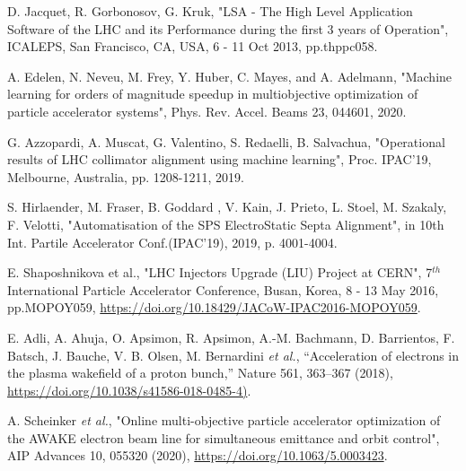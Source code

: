 \documentclass[
 reprint,
 amsmath,amssymb,amsfonts,clevref,
 aps,
prstab,
]{revtex4-2}
\begin{document}



% 

\begin{thebibliography}{9}

 D. Jacquet, R. Gorbonosov, G. Kruk, "LSA - The High Level Application Software of the LHC and its Performance during the first 3 years of Operation", ICALEPS, San Francisco, CA, USA, 6 - 11 Oct 2013, pp.thppc058.

 A. Edelen, N. Neveu, M. Frey, Y. Huber, C. Mayes, and A. Adelmann, "Machine learning for orders of magnitude speedup in multiobjective optimization of particle accelerator systems", Phys. Rev. Accel. Beams 23, 044601, 2020.

 G. Azzopardi, A. Muscat, G. Valentino, S. Redaelli, B. Salvachua, "Operational results of LHC collimator alignment using machine learning", Proc. IPAC'19, Melbourne, Australia, pp. 1208-1211, 2019.

 S. Hirlaender, M. Fraser, B. Goddard , V. Kain, J. Prieto, L. Stoel, M. Szakaly, F. Velotti, "Automatisation of the SPS ElectroStatic Septa Alignment",  
in 10th Int. Partile Accelerator Conf.(IPAC'19), 2019, p. 4001-4004.

 E. Shaposhnikova et al., "LHC Injectors Upgrade (LIU) Project at CERN", 7$^{th}$ International Particle Accelerator Conference, Busan, Korea, 8 - 13 May 2016, pp.MOPOY059, \url{https://doi.org/10.18429/JACoW-IPAC2016-MOPOY059}.

 E. Adli, A. Ahuja, O. Apsimon, R. Apsimon, A.-M. Bachmann, D. Barrientos, F. Batsch, J. Bauche, V. B. Olsen, M. Bernardini \textit{et al.}, “Acceleration of electrons in the plasma wakefield of a proton bunch,” Nature 561, 363–367 (2018), \url{https://doi.org/10.1038/s41586-018-0485-4)}.

 A. Scheinker \textit{et al.}, "Online multi-objective particle accelerator optimization of the AWAKE electron beam line for simultaneous emittance and orbit control", AIP Advances 10, 055320 (2020), \url{https://doi.org/10.1063/5.0003423}.


\end{thebibliography}
\end{document}
